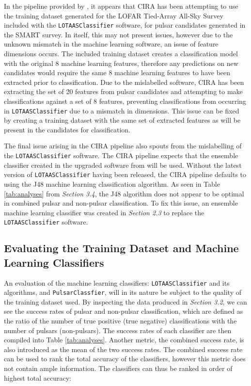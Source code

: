 \documentclass{article}
\begin{document}
In the pipeline provided by \textcite{swainston:git}, it appears that CIRA has been attempting to use the training dataset generated for the LOFAR Tied-Array All-Sky Survey included with the \verb|LOTAASClassifier| software, for pulsar candidates generated in the SMART survey. In itself, this may not present issues, however due to the unknown mismatch in the machine learning software, an issue of feature dimensions occurs. The included training dataset creates a classification model with the original 8 machine learning features, therefore any predictions on new candidates would require the same 8 machine learning features to have been extracted prior to classification. Due to the mislabelled software, CIRA has been extracting the set of 20 features from pulsar candidates and attempting to make classifications against a set of 8 features, preventing classifications from occurring in \verb|LOTAASClassifier| due to a mismatch in dimensions. This issue can be fixed by creating a training dataset with the same set of extracted features as will be present in the candidates for classification.

The final issue arising in the CIRA pipeline also spouts from the mislabelling of the \verb|LOTAASClassifier| software. The CIRA pipeline expects that the ensemble classifier created in the upgraded software from \textcite{tan} will be used. Without the latest version of \verb|LOTAASClassifier| having been released, the CIRA pipeline defaults to using the J48 machine learning classification algorithm. As seen in Table \ref{tab:analyses} from \emph{Section 3.4}, the J48 algorithm does not appear to be optimal in combined pulsar and non-pulsar classification. To fix this issue, an ensemble machine learning classifier was created in \emph{Section 2.3} to replace the \verb|LOTAASClassifier| software.

\subsection{Evaluating the Training Dataset and Machine Learning Classifiers}

An evaluation of the machine learning classifiers: \verb|LOTAASClassifier| and its algorithms, and \verb|PulsarClassfier|, will in its nature be subject to the quality of the training dataset used. By inspecting the data produced in \emph{Section 3.2}, we can see the success rates of pulsar and non-pulsar classification, which are defined as the ratio of the number of true positive (true negative) classifications with the number of pulsars (non-pulsars). The success rates of each classifier are then compiled into Table \ref{tab:analyses}. Another metric, the combined success rate, is also introduced as the mean of the two success rates. The combined success rate can be used to rank the total accuracy of the classifiers, however this metric does not contain ample information. The classifiers can thus be ranked in order of highest total accuracy:
\end{document}

